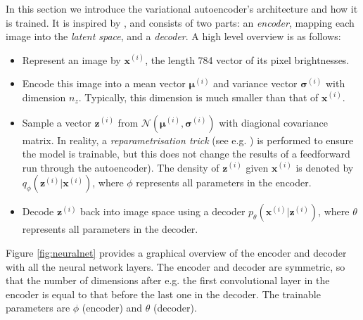 \documentclass[]{article}
\begin{document}
\hspace{\parindent} In this section we introduce the variational autoencoder's architecture and how it is trained. It is inspired by \cite{notes, frans, altosaar, shafkat}, and consists of two parts: an \textit{encoder}, mapping each image into the \textit{latent space}, and a \textit{decoder}. A high level overview is as follows:
\begin{itemize}
\item Represent an image by $\bm{x}^{(i)}$, the length 784 vector of its pixel brightnesses.
\item Encode this image into a mean vector $\bm{\mu}^{(i)}$ and variance vector $\bm{\sigma}^{(i)}$ with dimension $n_z$. Typically, this dimension is much smaller than that of $\bm{x}^{(i)}$. 
\item Sample a vector $\bm{z}^{(i)}$ from $\mathcal{N}(\bm{\mu}^{(i)}, \bm{\sigma}^{(i)})$ with diagional covariance matrix. In reality, a \textit{reparametrisation trick} (see e.g. \cite{notes}) is performed to ensure the model is trainable, but this does not change the results of a feedforward run through the autoencoder). The density of $\bm{z}^{(i)}$ given $\bm{x}^{(i)}$ is denoted by $q_{\phi}(\bm{z}^{(i)}|\bm{x}^{(i)})$, where $\phi$ represents all parameters in the encoder.
\item Decode $\bm{z}^{(i)}$ back into image space using a decoder $p_{\theta}(\bm{x}^{(i)}|\bm{z}^{(i)})$, where $\theta$ represents all parameters in the decoder.
\end{itemize}
Figure \ref{fig:neuralnet} provides a graphical overview of the encoder and decoder with all the neural network layers. The encoder and decoder are symmetric, so that the number of dimensions after e.g. the first convolutional layer in the encoder is equal to that before the last one in the decoder. The trainable parameters are $\phi$ (encoder) and $\theta$ (decoder).  
\end{document}
